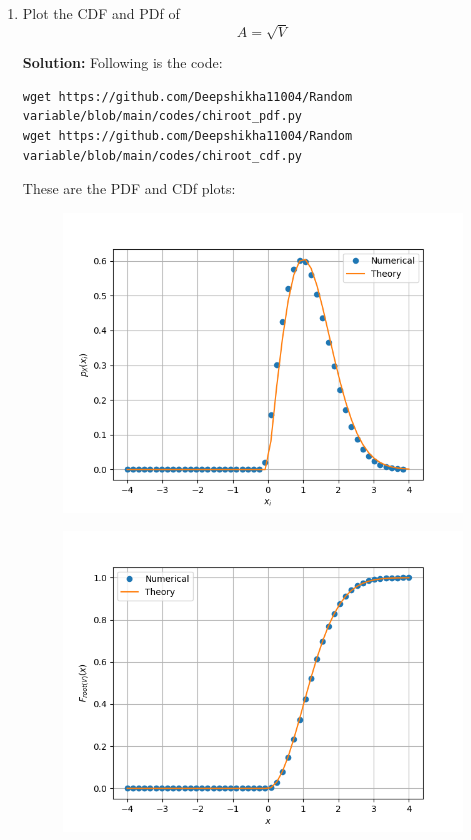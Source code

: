 \documentclass[journal,12pt,twocolumn]{IEEEtran}
\renewcommand\thesection{\arabic{section}}
\begin{document}
\begin{enumerate}[label=\thesection.\arabic*
,ref=\thesection.\theenumi]
%
\item
\label{ch3_raleigh_sim}
Plot the CDF and PDf of
%
\begin{equation}
A = \sqrt{V}
\end{equation}

\textbf{Solution:}
Following is the code:
\begin{lstlisting}
wget https://github.com/Deepshikha11004/Random variable/blob/main/codes/chiroot_pdf.py
wget https://github.com/Deepshikha11004/Random variable/blob/main/codes/chiroot_cdf.py
\end{lstlisting}
These are the PDF and CDf plots:
\begin{figure}[!ht]
    \centering
    \includegraphics[width=\columnwidth]
    {root_V.png}
    \caption{}
    \label{fig6}
\end{figure}
\begin{figure}[!ht]
    \centering
    \includegraphics[width=\columnwidth]
    {rootV_cdf.png}
    \caption{}
    \label{fig6}
\end{figure}

\end{enumerate}
\end{document}
